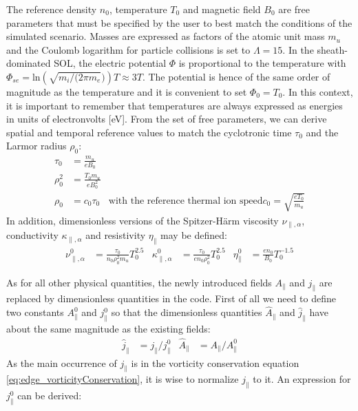 The reference density $n_0$, temperature $T_0$ and magnetic field $B_0$ are free parameters that must be specified by the user to best match the conditions of the simulated scenario. Masses are expressed as factors of the atomic unit mass $m_u$ and the Coulomb logarithm for particle collisions is set to $\Lambda = 15$. In the sheath-dominated SOL, the electric potential $\Phi$ is proportional to the temperature with $\Phi_{se} = $ln$\left(\sqrt{m_i/(2\pi m_e})\right)T\approx3T$. The potential is hence of the same order of magnitude as the temperature and it is convenient to set $\Phi_0 = T_0$. In this context, it is important to remember that temperatures are always expressed as energies in units of electronvolts [eV]. From the set of free parameters, we can derive spatial and temporal reference values to match the cyclotronic time $\tau_0$ and the Larmor radius $\rho_0$:
\begin{align}
	\tau_0 &= \frac{m_u}{eB_0} \\
	\rho_0^2 &= \frac{T_0m_u}{eB_0^2} \\
	\rho_0 &= c_0 \tau_0 & \text{with the reference thermal ion speed} c_0 = \sqrt{\frac{eT_0}{m_u}}
\end{align}
In addition, dimensionless versions of the Spitzer-Härm viscosity $\nu_{\parallel,\alpha}$, conductivity $\kappa_{\parallel,\alpha}$ and resistivity $\eta_\parallel$ may be defined:
\begin{align}
	\nu_{\parallel,\alpha}^0 &= \frac{\tau_0}{n_0\rho_0^2m_u}T_0^{2.5} & %
	\kappa_{\parallel,\alpha}^0 &= \frac{\tau_0}{en_0\rho_0^2}T_0^{2.5} & %
	\eta_\parallel^0 &= \frac{en_0}{B_0}T_0^{-1.5} %
\end{align}

As for all other physical quantities, the newly introduced fields $A_\parallel$ and $j_\parallel$ are replaced by dimensionless quantities in the code. First of all we need to define two constants $A_\parallel^0$ and $j_\parallel^0$ so that the dimensionless quantities $\hat{A}_\parallel$ and $\hat{j}_\parallel$ have about the same magnitude as the existing fields:
\begin{align}
	\hat{j}_\parallel &= j_\parallel / j_\parallel^0 & \hat{A}_\parallel &= A_\parallel / A_\parallel^0
\end{align}
As the main occurrence of $j_\parallel$ is in the vorticity conservation equation \ref{eq:edge_vorticityConservation}, it is wise to normalize $j_\parallel$ to it. An expression for $j_\parallel^0$ can be derived:

